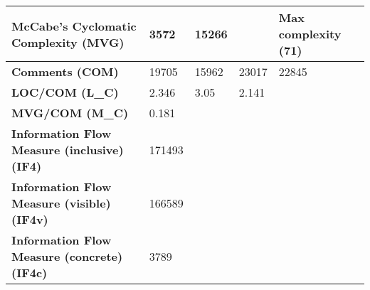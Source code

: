 \begin{table}[]
\begin{tabular}{|l|l|l|l|l|}
\textbf{McCabe's Cyclomatic Complexity (MVG)}       & 3572          & 15266              &                                          & Max complexity (71)    \\ \hline
\textbf{Comments (COM)}                             & 19705         & 15962              & 23017                                    & 22845                  \\ \hline
\textbf{LOC/COM (L\_C)}                             & 2.346         & 3.05               & 2.141                                    &                        \\ \hline
\textbf{MVG/COM (M\_C)}                             & 0.181         &                    &                                          &                        \\ \hline
\textbf{Information Flow Measure (inclusive) (IF4)} & 171493        &                    &                                          &                        \\ \hline
\textbf{Information Flow Measure (visible) (IF4v)}  & 166589        &                    &                                          &                        \\ \hline
\textbf{Information Flow Measure (concrete) (IF4c)} & 3789          &                    &                                          &                        \\ \hline
\end{tabular}
\end{table}